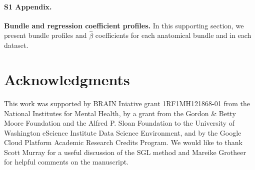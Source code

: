 \documentclass[10pt,letterpaper]{article}
\begin{document}
\paragraph*{S1 Appendix.}
\label{S1_Appendix}
{\bf Bundle and regression coefficient profiles.}
In this supporting section, we present bundle profiles and $\hat{\beta}$ coefficients
for each anatomical bundle and in each dataset.

\section*{Acknowledgments}

This work was supported by BRAIN Iniative grant 1RF1MH121868-01 from the
National Institutes for Mental Health, by a grant from the Gordon \& Betty
Moore Foundation and the Alfred P. Sloan Foundation to the University of
Washington eScience Institute Data Science Environment, and by the Google
Cloud Platform Academic Research Credits Program. We would like to thank
Scott Murray for a useful discussion of the SGL method and Mareike Grotheer
for helpful comments on the manuscript.

\nolinenumbers


\end{document}
